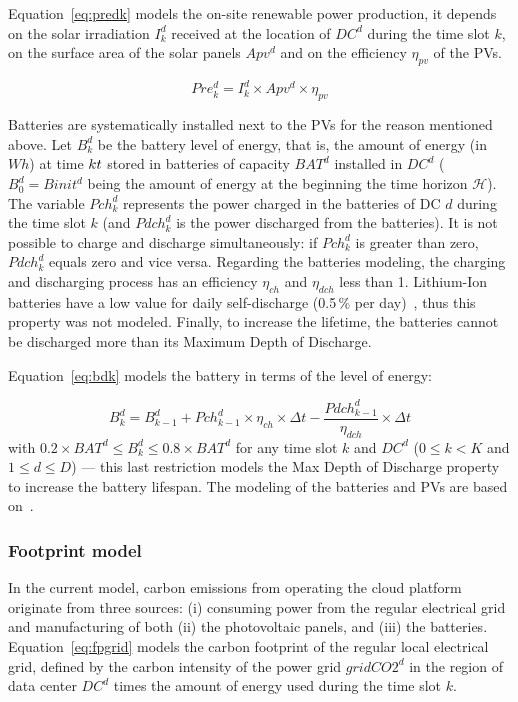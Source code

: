 Equation~\eqref{eq:predk} models the on-site renewable power production,  it depends on the solar irradiation $I^d_k$ received at the location of $DC^d$ during the time slot $k$, on the surface area of the solar panels $Apv^d$ and on the efficiency $\eta_{pv}$ of the PVs. 

\begin{equation} \label{eq:predk}
    Pre^d_{k}= I^d_k \times Apv^d \times \eta_{pv}
\end{equation}


Batteries are systematically installed next to the PVs for the reason mentioned above. Let $B^d_k$ be the battery level of energy, that is, the amount of energy (in $Wh$) at time $k\time\Delta t$ stored in batteries of capacity $BAT^d$ installed in $DC^d$ ($B^d_0 = Binit^d$ being the amount of energy at the beginning the time horizon $\mathcal{H}$). The variable $Pch_k^d$ represents the power charged in the batteries of DC $d$ during the time slot $k$ (and $Pdch_k^d$ is the power discharged from the batteries). It is not possible to charge and discharge simultaneously: if $Pch^d_k$ is greater than zero, $Pdch^d_k$ equals zero and vice versa. Regarding the batteries modeling, the charging and discharging process has an efficiency $\eta_{ch}$ and $\eta_{dch}$ less than 1. Lithium-Ion batteries have a low value for daily self-discharge (0.5\,\% per day)~\cite{wang2012_EDCS}, thus this property was not modeled. Finally, to increase the lifetime, the batteries cannot be discharged more than its Maximum Depth of Discharge. 

Equation~\eqref{eq:bdk} models the battery in terms of the level of energy:

\begin{equation} \label{eq:bdk}
  B^d_k = B^d_{k-1}  + Pch^d_{k-1} \times \eta_{ch} \times \Delta{t} - \frac{Pdch^d_{k-1}}{\eta_{dch}} \times \Delta{t}
\end{equation}
with $0.2\times BAT^d \leq B^d_k\leq 0.8\times BAT^d$ for any time slot $k$ and $DC^d$ ($0\leq k<K$ and $1\leq d\leq D$) --- this last restriction models the Max Depth of Discharge property to increase the battery lifespan. The modeling of the batteries and PVs are based on~\cite{2021NICOD_ILP}.


\subsubsection{Footprint model} \label{sec:footprintmodel_ccgrid}


In the current model, carbon emissions from operating the cloud platform originate from three sources: (i) consuming power from the regular electrical grid and manufacturing of both (ii) the photovoltaic panels, and (iii) the batteries. Equation~\eqref{eq:fpgrid} models the carbon footprint of the regular local electrical grid, defined by the carbon intensity of the power grid $gridCO2^d$ in the region of data center $DC^d$  times the amount of energy used during the time slot $k$.

